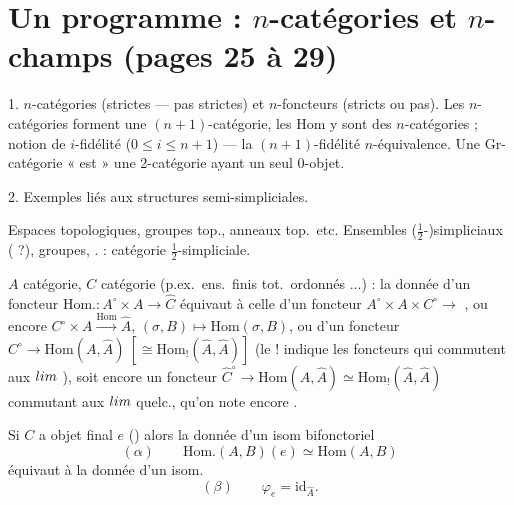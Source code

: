 \documentclass[11pt,a4paper]{article}
\begin{document}
\section*{Un programme : $n$-catégories et $n$-champs (pages 25 à 29)}


1. $n$-catégories (strictes — pas strictes) et $n$-foncteurs (stricts ou
pas).  Les $n$-catégories forment une $(n{+}1)$-catégorie, les Hom y sont
des $n$-catégories ; notion de $i$-fidélité ($0 \leq i \leq n+1$) — la
$(n{+}1)$-fidélité  $n$-équivalence.
 Une Gr-catégorie « est » une 2-catégorie ayant un seul
0-objet.

2. Exemples liés aux structures semi-simpliciales.

Espaces topologiques, groupes top., anneaux top.\ etc. Ensembles
($\tfrac12$-)simpliciaux \struck{\ill} ( ?), groupes,
 .
 : catégorie $\tfrac12$-simpliciale.

$A$ catégorie, $C$ \struck{\ill} catégorie (p.ex.\ ens.\ finis tot.\
ordonnés  ...) : la donnée d'un foncteur
$\mathrm{Hom}. : A^{\circ} \times A \to \hat{C}$
équivaut à celle d'un foncteur $A^{\circ} \times A \times C^{\circ} \to$
\uncertain{Ens}, ou encore $C^{\circ} \times A \xrightarrow{\mathrm{Hom}}
\hat{A}$, $(\sigma, B) \mapsto \mathrm{Hom}(\sigma, B)$, ou d'un foncteur
\marginal{$\sigma \mapsto \varphi_{\sigma}$}
$C^{\circ} \to \mathrm{Hom}(A, \hat{A})\ [\cong \mathrm{Hom}_{!}(\hat{A},
\hat{A})]$ (le $!$ indique les foncteurs qui commutent aux $\varinjlim$
\uncertain{quelc.}), soit encore un foncteur $\hat{C}^{\circ} \to
\mathrm{Hom}(A, \hat{A}) \simeq \mathrm{Hom}_{!}(\hat{A}, \hat{A})$
commutant aux $\varinjlim$ quelc., qu'on note encore \uncertain{$\sigma
\mapsto h_{\sigma}$}.

Si $C$ a objet final $e$ () alors la
donnée d'un isom bifonctoriel
\[
(\alpha) \qquad \mathrm{Hom}.(A,B)(e) \simeq \mathrm{Hom}(A,B)
\]
équivaut à la donnée d'un isom.
\[
(\beta) \qquad \varphi_{e} = \mathrm{id}_{\hat{A}}.
\]
\end{document}
